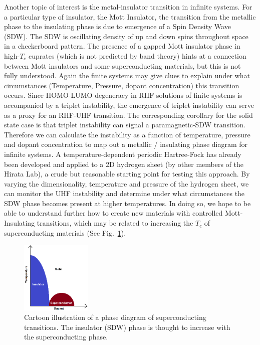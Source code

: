 \documentclass{revtex4}
\begin{document}
    Another topic of interest is the metal-insulator transition in infinite systems. For a 
    particular type of insulator, the Mott Insulator, the transition from the metallic phase to the 
    insulating phase is due to emergence of a Spin Density Wave (SDW). The SDW is oscillating 
    density of up and down spins throughout space in a checkerboard pattern. The presence of a 
    gapped Mott insulator phase in high-$T_c$ cuprates (which is not predicted by band 
    theory) hints at 
    a connection between Mott insulators and some superconducting materials, but this is not fully 
    understood. Again the finite 
    systems may give clues to 
    explain under what circumstances (Temperature, Pressure, dopant concentration) this transition 
    occurs. Since HOMO-LUMO degeneracy in RHF solutions of finite systems is accompanied by a 
    triplet instability, the emergence of triplet instability can serve as a proxy for an RHF-UHF 
    transition. The corresponding corollary for the solid state case is that triplet instability 
    can signal a paramagnetic-SDW transition. Therefore we can calculate the instability as a 
    function of temperature, pressure and dopant concentration to map out a metallic / insulating 
    phase diagram for infinite systems. A temperature-dependent periodic Hartree-Fock has already 
    been developed and applied to a 2D hydrogen sheet (by other members of the Hirata Lab), a crude 
    but reasonable starting point for testing this approach. By varying the dimensionality, 
    temperature and pressure of the hydrogen sheet, we can monitor the UHF instability and 
    determine under what circumstances the SDW phase becomes present at higher temperatures. In 
    doing so, we hope to be able to understand further how to create new materials with controlled 
    Mott-Insulating transitions, which may be related to increasing the $T_c$ of superconducting 
    materials (See Fig.~\ref{scphase}). 
    
    \begin{figure}
       	\centering
       	\includegraphics[width=0.3\textwidth]{../figures/NSFdiagram.png}
       	\caption{Cartoon illustration of a phase diagram of superconducting transitions. The insulator (SDW) phase is thought to increase with the superconducting phase.}
       	\label{scphase}
    \end{figure}
    
\end{document}
